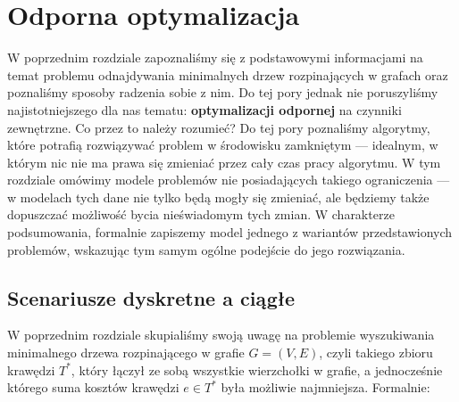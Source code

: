 \chapter{Odporna optymalizacja}\label{ch:minmax}
\thispagestyle{chapterBeginStyle}

W poprzednim rozdziale zapoznaliśmy się z podstawowymi informacjami na temat problemu odnajdywania minimalnych drzew rozpinających w grafach oraz poznaliśmy sposoby radzenia sobie z nim. Do tej pory jednak nie poruszyliśmy najistotniejszego dla nas tematu: \textbf{optymalizacji odpornej} na czynniki zewnętrzne. Co przez to należy rozumieć? Do tej pory poznaliśmy algorytmy, które potrafią rozwiązywać problem w środowisku zamkniętym --- idealnym, w którym nic nie ma prawa się zmieniać przez cały czas pracy algorytmu. W tym rozdziale omówimy modele problemów nie posiadających takiego ograniczenia --- w modelach tych dane nie tylko będą mogły się zmieniać, ale będziemy także dopuszczać możliwość bycia nieświadomym tych zmian. W charakterze podsumowania, formalnie zapiszemy model jednego z wariantów przedstawionych problemów, wskazując tym samym ogólne podejście do jego rozwiązania.

\section{Scenariusze dyskretne a ciągłe}

W poprzednim rozdziale skupialiśmy swoją uwagę na problemie wyszukiwania minimalnego drzewa rozpinającego w grafie $G = \left( V, E \right)$, czyli takiego zbioru krawędzi $T^{\ast}$, który łączył ze sobą wszystkie wierzchołki w grafie, a jednocześnie którego suma kosztów krawędzi $e \in T^{\ast}$ była możliwie najmniejsza. Formalnie:

